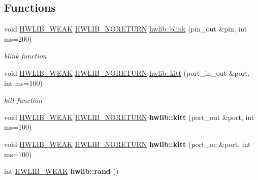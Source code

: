 \subsection*{Functions}
\begin{DoxyCompactItemize}
\item 
void \hyperlink{hwlib-defines_8hpp_a04be4340016df60d6636c1d1c6d94fc9}{H\+W\+L\+I\+B\+\_\+\+W\+E\+AK} \hyperlink{hwlib-defines_8hpp_aef311f1f416fdcbd1fa22376dcc01029}{H\+W\+L\+I\+B\+\_\+\+N\+O\+R\+E\+T\+U\+RN} \hyperlink{namespacehwlib_a80ba9dfd5a09c9da29bcc865a5fc85ff}{hwlib\+::blink} (pin\+\_\+out \&pin, int ms=200)
\begin{DoxyCompactList}\small\item\em blink function \end{DoxyCompactList}\item 
void \hyperlink{hwlib-defines_8hpp_a04be4340016df60d6636c1d1c6d94fc9}{H\+W\+L\+I\+B\+\_\+\+W\+E\+AK} \hyperlink{hwlib-defines_8hpp_aef311f1f416fdcbd1fa22376dcc01029}{H\+W\+L\+I\+B\+\_\+\+N\+O\+R\+E\+T\+U\+RN} \hyperlink{namespacehwlib_af01d061e28150ea14c1e9d01183792d3}{hwlib\+::kitt} (port\+\_\+in\+\_\+out \&port, int ms=100)
\begin{DoxyCompactList}\small\item\em kitt function \end{DoxyCompactList}\item 
void \hyperlink{hwlib-defines_8hpp_a04be4340016df60d6636c1d1c6d94fc9}{H\+W\+L\+I\+B\+\_\+\+W\+E\+AK} \hyperlink{hwlib-defines_8hpp_aef311f1f416fdcbd1fa22376dcc01029}{H\+W\+L\+I\+B\+\_\+\+N\+O\+R\+E\+T\+U\+RN} {\bfseries hwlib\+::kitt} (port\+\_\+out \&port, int ms=100)\hypertarget{namespacehwlib_afe638539acc989325624e978e3d1f329}{}\label{namespacehwlib_afe638539acc989325624e978e3d1f329}

\item 
void \hyperlink{hwlib-defines_8hpp_a04be4340016df60d6636c1d1c6d94fc9}{H\+W\+L\+I\+B\+\_\+\+W\+E\+AK} \hyperlink{hwlib-defines_8hpp_aef311f1f416fdcbd1fa22376dcc01029}{H\+W\+L\+I\+B\+\_\+\+N\+O\+R\+E\+T\+U\+RN} {\bfseries hwlib\+::kitt} (port\+\_\+oc \&port, int ms=100)\hypertarget{namespacehwlib_aa809d974c66cb1552aae0ae0fee7bb36}{}\label{namespacehwlib_aa809d974c66cb1552aae0ae0fee7bb36}

\item 
int \hyperlink{hwlib-defines_8hpp_a04be4340016df60d6636c1d1c6d94fc9}{H\+W\+L\+I\+B\+\_\+\+W\+E\+AK} {\bfseries hwlib\+::rand} ()\hypertarget{namespacehwlib_a9036fd0378141680d2e2a1b4a4eb52c9}{}\label{namespacehwlib_a9036fd0378141680d2e2a1b4a4eb52c9}


\end{DoxyCompactItemize}

